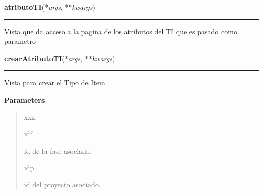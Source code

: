 \hspace{.8\funcindent}\begin{boxedminipage}{\funcwidth}

    \raggedright \textbf{atributoTI}(*\textit{args}, **\textit{kwargs})

    \vspace{-1.5ex}

    \rule{\textwidth}{0.5\fboxrule}
\setlength{\parskip}{2ex}
    Vista que da acceso a la pagina de los atributos del TI que es pasado 
    como parametro

\setlength{\parskip}{1ex}
    \end{boxedminipage}

    \label{app:vista:vistaAtributoTI:crearAtributoTI}

    \vspace{0.5ex}

\hspace{.8\funcindent}\begin{boxedminipage}{\funcwidth}

    \raggedright \textbf{crearAtributoTI}(*\textit{args}, **\textit{kwargs})

    \vspace{-1.5ex}

    \rule{\textwidth}{0.5\fboxrule}
\setlength{\parskip}{2ex}
    Vista para crear el Tipo de Item

\setlength{\parskip}{1ex}
      \textbf{Parameters}
      \vspace{-1ex}

      \begin{quote}
        \begin{Ventry}{xxx}

          \item[idf]

          id de la fase asociada.

          \item[idp]

          id del proyecto asociado.

        \end{Ventry}

      \end{quote}

    \end{boxedminipage}

